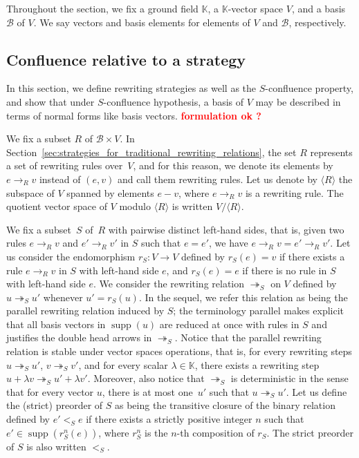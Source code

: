 \documentclass[11pt]{article}
\theoremstyle{definition}
\newcommand\todo[1]{{\bf\textcolor{red}{#1}}}
\newcommand\basis{\mathscr{B}}
\newcommand\ordS{<_S}
\DeclareMathOperator{\supp}{supp}
\newcommand\K{\mathbb{K}}
\newcommand\Span[1]{\langle #1\rangle}
\newcommand\rewR{\to_R}
\newcommand\parS{\twoheadrightarrow_S}
\begin{document}
Throughout the section, we fix a ground field $\K$, a $\K$-vector space
$V$, and a basis $\basis$ of $V$. We say vectors and basis elements for
elements of $V$ and $\basis$, respectively. 

\subsection{Confluence relative to a strategy}
\label{sec:confluence_relative_to_a_strategy}

In this section, we define rewriting strategies as well as the
$S$-confluence property, and show that under $S$-confluence hypothesis, a
basis of $V$ may be described in terms of normal forms like basis vectors.
\todo{formulation ok ?}
\medskip 

We fix a subset $R$ of $\basis\times V$. In
Section~\ref{sec:strategies_for_traditional_rewriting_relations}, the set
$R$ represents a set of rewriting rules over~$V$, and for this reason, we
denote its elements by $e\rewR v$ instead of $(e,v)$ and call them
rewriting rules. Let us denote by $\Span{R}$ the subspace of $V$ spanned
by elements $e-v$, where $e\rewR v$ is a rewriting rule. The quotient
vector space of $V$ modulo $\Span{R}$ is written $V/\Span{R}$. 
\medskip

We fix a subset~$S$ of~$R$ with pairwise distinct left-hand sides, that
is, given two rules $e\rewR v$ and $e'\rewR v'$ in $S$ such that $e=e'$,
we have $e\rewR v=e'\rewR v'$. Let us consider the endomorphism
$r_S:V\to V$ defined by $r_S(e)=v$ if there exists a rule $e\rewR v$ in
$S$ with left-hand side $e$, and $r_S(e)=e$ if there is no rule in $S$
with left-hand side $e$. We consider the rewriting relation $\parS$ on
$V$ defined by $u\parS u'$ whenever $u'=r_S(u)$. In the sequel, we refer
this relation as being the parallel rewriting relation induced by $S$;
the terminology parallel makes explicit that all basis vectors in
$\supp(u)$ are reduced at once with rules in $S$ and justifies the double
head arrows in $\parS$. Notice that the parallel rewriting relation is
stable under vector spaces operations, that is, for every rewriting steps
$u\parS u'$, $v\parS v'$, and for every scalar $\lambda\in\K$, there
exists a rewriting step $u+\lambda v\parS u'+\lambda v'$. Moreover, also
notice that $\parS$ is deterministic in the sense that for every vector
$u$, there is at most one~$u'$ such that $u\parS u'$. Let us define the
(strict) preorder of $S$ as being the transitive closure of the binary
relation defined by $e'\ordS e$ if there exists a strictly positive
integer $n$ such that $e'\in\supp(r_S^n(e))$, where $r_S^n$ is the $n$-th
composition of $r_S$. The strict preorder of $S$ is also written $\ordS$.
\medskip
\end{document}
